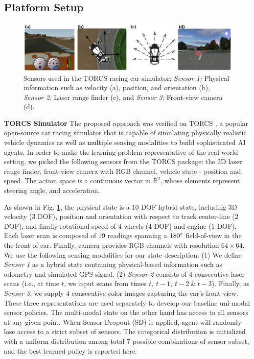\documentclass[../thesis.tex]{subfiles}
\begin{document}
\subsection{Platform Setup} \label{sec:platform}

\begin{figure}[t]
	\centering
	\vskip 0.2in
	\includegraphics[width=\columnwidth]{./MultimodalDRL/fig/TORCS.png} %
	\caption{Sensors used in the TORCS racing car simulator: \textit{Sensor 1:} Physical information such as velocity (a), position, and orientation (b), \textit{Sensor 2:} Laser range finder (c), and \textit{Sensor 3:} Front-view camera (d).}
	\label{fig:TORCS}
\end{figure} 

\textbf{TORCS Simulator}
The proposed approach was verified on TORCS \cite{wymann2000torcs}, a popular open-source car racing simulator that is capable of simulating physically realistic vehicle dynamics as well as multiple sensing modalities \cite{GymTORCS} to build sophisticated AI agents. In order to make the learning problem representative of the real-world setting, we picked the following sensors from the TORCS package: the 2D laser range finder, front-view camera with RGB channel, vehicle state - position and speed. The action space is a continuous vector in $\mathbb{R}^2$, whose elements represent steering angle, and acceleration. 

As shown in Fig. \ref{fig:TORCS}, the physical state is a $10$ DOF hybrid state, including $3$D velocity ($3$ DOF), position and orientation with respect to track center-line ($2$ DOF), and finally rotational speed of $4$ wheels ($4$ DOF) and engine ($1$ DOF). Each laser scan is composed of $19$ readings spanning a $180\degree$ field-of-view in the the front of car. Finally, camera provides RGB channels with resolution $64 \times 64$. We use the following sensing modalities for our state description: (1) We define \emph{Sensor 1} as a hybrid state containing physical-based information such as odometry and simulated GPS signal. (2) \emph{Sensor 2} consists of $4$ consecutive laser scans (i.e., at time $t$, we input scans from times $t,~ t-1,~t-2~\&~t-3$). Finally, as \emph{Sensor 3}, we supply $4$ consecutive color images capturing the car's front-view. These three representations are used separately to develop our baseline uni-modal sensor policies. The multi-modal state on the other hand has access to all sensors at any given point. When Sensor Dropout (SD) is applied, agent will randomly lose access to a strict subset of sensors. The categorical distribution is initialized with a uniform distribution among total $7$ possible combinations of sensor subset, and the best learned policy is reported here. 
\end{document}
